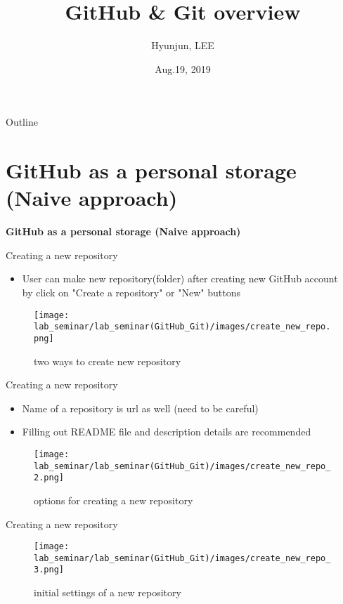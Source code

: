 \documentclass[11pt, xelatex]{beamer}
\title[] %
{\textbf{GitHub \& Git overview}}
\author[Hyunjun, LEE] %
{Hyunjun, LEE}%
\institute[Korea University] %
{
	Department of Statistics\\ \vspace{.1cm}
	Korea University}
\date{Aug.19, 2019}
\newcommand{\bi}{\begin{itemize}}
\newcommand{\ei}{\end{itemize}}
\begin{document}
\begin{frame}
	\titlepage
\end{frame}
\begin{frame}{Outline}
	\tableofcontents
\end{frame}



\section{GitHub as a personal storage (Naive approach)}
\begin{frame}
\Large
\centering
\textbf{GitHub as a personal storage (Naive approach)}
\end{frame}
\begin{frame}{Creating a new repository}
\bi
\item User can make new repository(folder) after creating new GitHub account \\ by click on  "Create a repository" or "New" buttons
\ei
\begin{figure}
	\texttt{[image: lab\_seminar/lab\_seminar(GitHub\_Git)/images/create\_new\_repo.png]}
	\inclue
	\caption{two ways to create new repository}
\end{figure}
\end{frame}

\begin{frame}{Creating a new repository}
\bi
\item Name of a repository is url as well (need to be careful)
\item Filling out README file and description details are recommended
\ei
\begin{figure}
	\texttt{[image: lab\_seminar/lab\_seminar(GitHub\_Git)/images/create\_new\_repo\_2.png]}
	\inclue
	\caption{options for creating a new repository}
\end{figure}
\end{frame}

\begin{frame}{Creating a new repository}
\begin{figure}
	\texttt{[image: lab\_seminar/lab\_seminar(GitHub\_Git)/images/create\_new\_repo\_3.png]}
	\inclue
	\caption{initial settings of a new repository}
\end{figure}
\end{frame}
\end{document}
